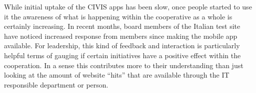 While initial uptake of the CIVIS apps has been slow, once people started to use it the
awareness of what is happening within the cooperative as a whole is certainly increasing.
In recent months, board members of the Italian test site have noticed increased response from members since making the mobile app available. 
For leadership, this kind of feedback
and interaction is particularly helpful terms of gauging if certain initiatives have a positive
effect within the cooperation. In a sense this contributes more to their understanding than
just looking at the amount of website ``hits'' that are available through the IT responsible
department or person. 

